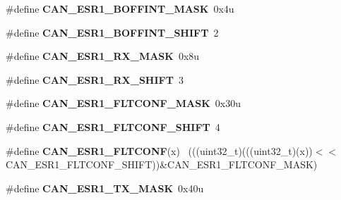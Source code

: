\begin{DoxyCompactItemize}
\item 
\hypertarget{group___c_a_n___register___masks_ga0f997f1d2ad00476745755aa74ce5084}{}\#define {\bfseries C\+A\+N\+\_\+\+E\+S\+R1\+\_\+\+B\+O\+F\+F\+I\+N\+T\+\_\+\+M\+A\+S\+K}~0x4u\label{group___c_a_n___register___masks_ga0f997f1d2ad00476745755aa74ce5084}

\item 
\hypertarget{group___c_a_n___register___masks_ga5e04e60e6627e38eaf02023308703a2e}{}\#define {\bfseries C\+A\+N\+\_\+\+E\+S\+R1\+\_\+\+B\+O\+F\+F\+I\+N\+T\+\_\+\+S\+H\+I\+F\+T}~2\label{group___c_a_n___register___masks_ga5e04e60e6627e38eaf02023308703a2e}

\item 
\hypertarget{group___c_a_n___register___masks_ga246ad2ff9dd50d1d6b931b5e42ef90b3}{}\#define {\bfseries C\+A\+N\+\_\+\+E\+S\+R1\+\_\+\+R\+X\+\_\+\+M\+A\+S\+K}~0x8u\label{group___c_a_n___register___masks_ga246ad2ff9dd50d1d6b931b5e42ef90b3}

\item 
\hypertarget{group___c_a_n___register___masks_ga5f5f765579cea7bfb561f84e62b96623}{}\#define {\bfseries C\+A\+N\+\_\+\+E\+S\+R1\+\_\+\+R\+X\+\_\+\+S\+H\+I\+F\+T}~3\label{group___c_a_n___register___masks_ga5f5f765579cea7bfb561f84e62b96623}

\item 
\hypertarget{group___c_a_n___register___masks_ga6c81fa9d3bec21a97a304319968216a8}{}\#define {\bfseries C\+A\+N\+\_\+\+E\+S\+R1\+\_\+\+F\+L\+T\+C\+O\+N\+F\+\_\+\+M\+A\+S\+K}~0x30u\label{group___c_a_n___register___masks_ga6c81fa9d3bec21a97a304319968216a8}

\item 
\hypertarget{group___c_a_n___register___masks_gadb93c702b83c1240d7b1a07fba1b33a3}{}\#define {\bfseries C\+A\+N\+\_\+\+E\+S\+R1\+\_\+\+F\+L\+T\+C\+O\+N\+F\+\_\+\+S\+H\+I\+F\+T}~4\label{group___c_a_n___register___masks_gadb93c702b83c1240d7b1a07fba1b33a3}

\item 
\hypertarget{group___c_a_n___register___masks_ga660b16c6a75cea6de61b6e6f37cc43ee}{}\#define {\bfseries C\+A\+N\+\_\+\+E\+S\+R1\+\_\+\+F\+L\+T\+C\+O\+N\+F}(x)                                        ~(((uint32\+\_\+t)(((uint32\+\_\+t)(x))$<$$<$C\+A\+N\+\_\+\+E\+S\+R1\+\_\+\+F\+L\+T\+C\+O\+N\+F\+\_\+\+S\+H\+I\+F\+T))\&C\+A\+N\+\_\+\+E\+S\+R1\+\_\+\+F\+L\+T\+C\+O\+N\+F\+\_\+\+M\+A\+S\+K)\label{group___c_a_n___register___masks_ga660b16c6a75cea6de61b6e6f37cc43ee}

\item 
\hypertarget{group___c_a_n___register___masks_ga29052f7ad6fc3da4cbcd9dce8ffa59f5}{}\#define {\bfseries C\+A\+N\+\_\+\+E\+S\+R1\+\_\+\+T\+X\+\_\+\+M\+A\+S\+K}~0x40u\label{group___c_a_n___register___masks_ga29052f7ad6fc3da4cbcd9dce8ffa59f5}


\end{DoxyCompactItemize}
